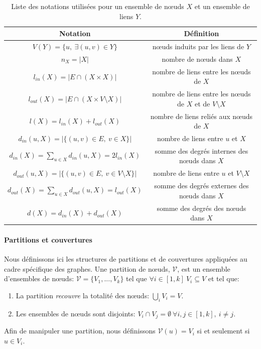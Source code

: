 \begin{table}
  \centering
  \hspace*{-18.225pt}
    \begin{tabular}{|c|c|}
     \hline
    \rule[-1ex]{0pt}{4ex} Notation & Définition \\
  \hline
		\hline
		\rule[-1ex]{0pt}{4ex}$V(Y)=\{u,\ \exists (u,v) \in Y \}$ & n\oe{}uds induits par les liens de $Y$\\
		\hline
        \rule[-1ex]{0pt}{4ex}$n_X=|X|$ & nombre de n\oe{}uds dans $X$\\
        \hline
        \rule[-1ex]{0pt}{4ex} $l_{in}(X)=|E \cap (X \times X)|$ & nombre de liens entre les n\oe{}uds de $X$\\
        \hline
        \rule[-1ex]{0pt}{4ex} $l_{out}(X)=|E \cap (X \times V \setminus X)|$ & nombre de liens entre les n\oe{}uds de $X$ et de $V \setminus X$ \\
        \hline
        \rule[-1ex]{0pt}{4ex} $l(X)=l_{in}(X)+l_{out}(X)$ & nombre de liens reliés aux n\oe{}uds de $X$\\
        \hline
        \rule[-1ex]{0pt}{4ex} $d_{in}(u,X)=|\{(u,v) \in E,\ v \in X\}|$ & nombre de liens entre $u$ et $X$ \\
        \hline
        \rule[-1ex]{0pt}{4ex} $d_{in}(X)=\sum_{u \in X} d_{in}(u,X)=2l_{in}(X)$ & somme des degrés internes des n\oe{}uds dans $X$ \\
        \hline
        \rule[-1ex]{0pt}{4ex} $d_{out}(u,X)=|\{(u,v) \in E,\ v \in V \setminus X\}|$ & nombre de liens entre $u$ et $V \setminus X$ \\
        \hline
       \rule[-1ex]{0pt}{4ex}  $d_{out}(X)=\sum_{u \in X} d_{out}(u,X)=l_{out}(X)$ & somme des degrés externes des n\oe{}uds dans $X$ \\
        \hline
        \rule[-1ex]{0pt}{4ex}  $d(X)=d_{in}(X)+ d_{out}(X)$ & somme des degrés des n\oe{}uds dans $X$ \\
        \hline
    \end{tabular}
    \caption{Liste des notations utilisées pour un ensemble de n\oe{}uds $X$ et un ensemble de liens $Y$.}
         \label{tab:notation_groupe_noeuds}
\end{table}%


\paragraph{Partitions et couvertures}
Nous définissons ici les structures de partitions et de couvertures appliquées au cadre spécifique des graphes.
Une partition de n\oe{}uds, $\mathcal{V}$, est un ensemble d'ensembles de n\oe{}uds: $\mathcal{V}= \{V_1,..., V_k\}$ tel que $\forall i \in [1,k]\ V_i \subseteq V$ et tel que:
\begin{enumerate}
\item La partition \emph{recouvre} la totalité des n\oe{}uds: $\bigcup_{i} V_i = V$.
\item Les ensembles de n\oe{}uds sont disjoints: $V_i \cap V_j = \emptyset\ \forall i,j \in [1,k],\ i \neq j$.
\end{enumerate}
Afin de manipuler une partition, nous définissons $\mathcal{V}(u)=V_i$ si et seulement si $u \in V_i$.
\bigskip

